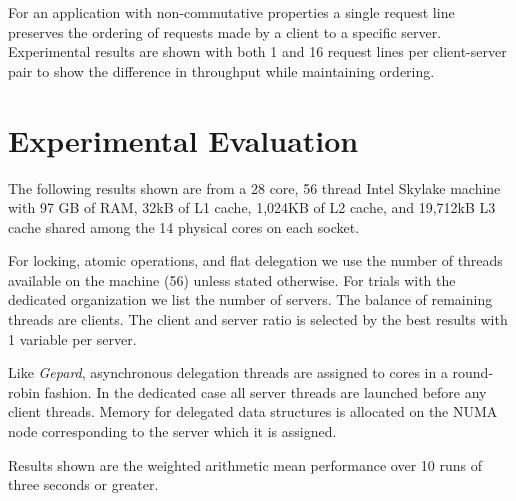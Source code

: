 \documentclass{uicthesi}
\begin{document}
For an application with non-commutative properties a single request line preserves the ordering of requests made by a client to a specific server. Experimental results are shown with both 1 and 16 request lines per client-server pair to show the difference in throughput while maintaining ordering. 


\chapter{Experimental Evaluation}
The following results shown are from a 28 core, 56 thread Intel Skylake machine with 97 GB of RAM, 32kB of L1 cache, 1,024KB of L2 cache, and 19,712kB L3 cache shared among the 14 physical cores on each socket. 

For locking, atomic operations, and flat delegation we use the number of threads available on the machine (56) unless stated otherwise. For trials with the dedicated organization we list the number of servers. The balance of remaining threads are clients.  The client and server ratio is selected by the best results with 1 variable per server. 

Like \textit{Gepard}, asynchronous delegation threads are assigned to cores in a round-robin fashion. In the dedicated case all server threads are launched before any client threads. Memory for delegated data structures is allocated on the NUMA node corresponding to the server which it is assigned. 

Results shown are the weighted arithmetic mean performance over 10 runs of three seconds or greater. 
\end{document}
